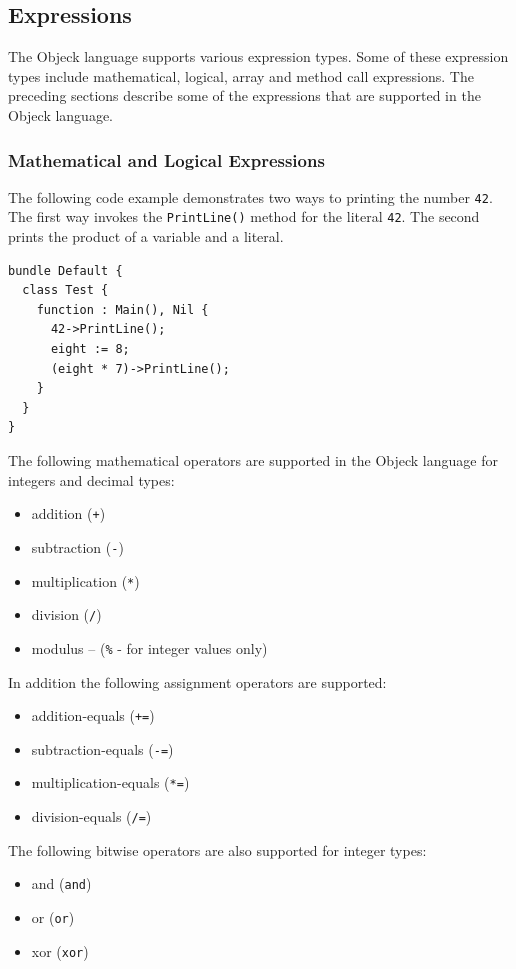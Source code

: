 \documentclass[12pt]{article}
\begin{document}
\subsection{Expressions}
The Objeck language supports various expression types.  Some of these expression types include mathematical, logical, array and method call expressions.  The preceding sections describe some of the expressions that are supported in the Objeck language.

\subsubsection{Mathematical and Logical Expressions}
The following code example demonstrates two ways to printing the number \texttt{42}.  The first way invokes the \texttt{PrintLine()} method for the literal \texttt{42}.  The second prints the product of a variable and a literal.

\begin{verbatim}
bundle Default {
  class Test {
    function : Main(), Nil {
      42->PrintLine();
      eight := 8;
      (eight * 7)->PrintLine();
    }
  }
}
\end{verbatim}

The following mathematical operators are supported in the Objeck language for integers and decimal types:
\begin{itemize}
    \item addition (\texttt{+})
    \item subtraction (\texttt{-})
    \item multiplication (\texttt{*})
    \item division (\texttt{/})
    \item modulus -- (\texttt{\%} - for integer values only)
\end{itemize}

In addition the following assignment operators are supported:
\begin{itemize}
    \item addition-equals (\texttt{+=})
    \item subtraction-equals (\texttt{-=})
    \item multiplication-equals (\texttt{*=})
    \item division-equals (\texttt{/=})
\end{itemize}

The following bitwise operators are also supported for integer types:
\begin{itemize}
    \item and (\texttt{and})
    \item or (\texttt{or})
    \item xor (\texttt{xor})
\end{itemize}
\end{document}
